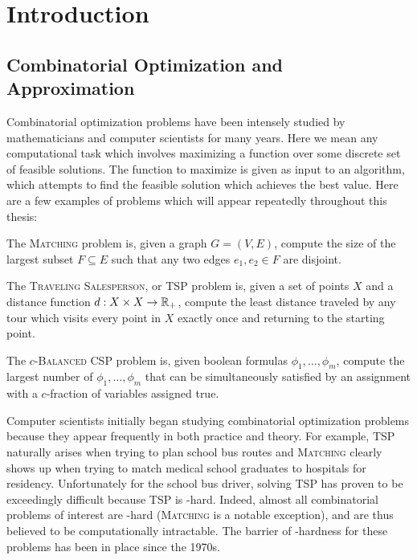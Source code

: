 \chapter{Introduction}\label{cha:introduction}

\section{Combinatorial Optimization and Approximation}
Combinatorial optimization problems have been intensely studied by mathematicians and computer scientists for many years.
Here we mean any computational task which involves maximizing a function over some discrete set of feasible solutions.
The function to maximize is given as input to an algorithm, which attempts to find the feasible solution which achieves the best value. 
Here are a few examples of problems which will appear repeatedly throughout this thesis: 
\begin{example}
The \textsc{Matching} problem is, given a graph $G = (V,E)$, compute the size of the largest subset $F \subseteq E$ such that any two edges $e_1,e_2 \in F$ are disjoint.
\end{example}
\begin{example}
The \textsc{Traveling Salesperson}, or \textsc{TSP} problem is, given a set of points $X$ and a distance function $d: X \times X \rightarrow \mathbb R_+$, compute the least distance traveled by any tour which visits every point in $X$ exactly once and returning to the starting point.
\end{example}
\begin{example}
The \textsc{$c$-Balanced CSP} problem is, given boolean formulas $\phi_1,\dots,\phi_m$, compute the largest number of $\phi_1,\dots,\phi_m$ that can be simultaneously satisfied by an assignment with a $c$-fraction of variables assigned true.
\end{example}

Computer scientists initially began studying combinatorial optimization problems because they appear frequently in both practice and theory.
For example, \textsc{TSP} naturally arises when trying to plan school bus routes and \textsc{Matching} clearly shows up when trying to match medical school graduates to hospitals for residency. Unfortunately for the school bus driver, solving \textsc{TSP} has proven to be exceedingly difficult because \textsc{TSP} is \np-hard\cite{Karp1972}. Indeed, almost all combinatorial problems of interest are \np-hard (\textsc{Matching} is a notable exception), and are thus believed to be computationally intractable. The barrier of \np-hardness for these problems has been in place since the 1970s.

